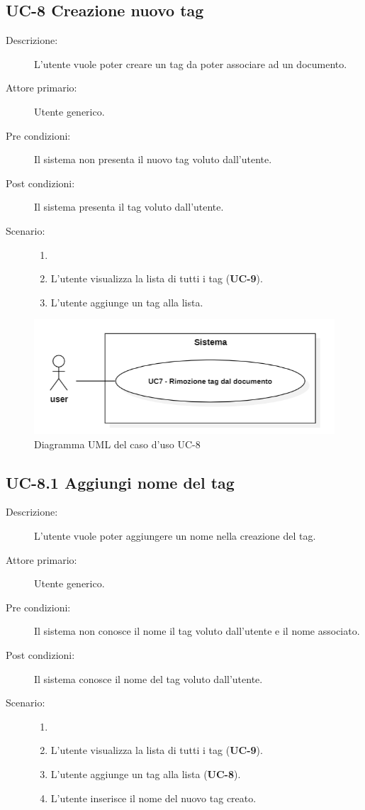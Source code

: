 \subsection{UC-8 Creazione nuovo tag}
\begin{description}
    \item[Descrizione:] L’utente vuole poter creare un tag da poter associare ad un documento.
    \item[Attore primario:] Utente generico.
    \item[Pre condizioni:] Il sistema non presenta il nuovo tag voluto dall’utente.
    \item[Post condizioni:] Il sistema presenta il tag voluto dall’utente.
    \item[Scenario:]
    \begin{enumerate}
        \item[]
        \item L’utente visualizza la lista di tutti i tag (\textbf{UC-9}).
        \item L'utente aggiunge un tag alla lista.
    \end{enumerate}
\end{description}

\begin{figure}[H]
    \centering
    \includegraphics[width=0.8\linewidth]{UC7.png} 
    \caption{Diagramma UML del caso d'uso UC-8}
    \label{fig:UC7}
\end{figure}

\subsection{UC-8.1 Aggiungi nome del tag}
\begin{description}
    \item[Descrizione:] L’utente vuole poter aggiungere un nome nella creazione del tag.
    \item[Attore primario:] Utente generico.
    \item[Pre condizioni:] Il sistema non conosce il nome  il tag voluto dall’utente e il nome associato.
    \item[Post condizioni:] Il sistema conosce il nome del tag voluto dall’utente.
    \item[Scenario:]
    \begin{enumerate}
        \item[]
        \item L’utente visualizza la lista di tutti i tag (\textbf{UC-9}).
        \item L'utente aggiunge un tag alla lista (\textbf{UC-8}).
        \item L'utente inserisce il nome del nuovo tag creato.
    \end{enumerate}
\end{description}

